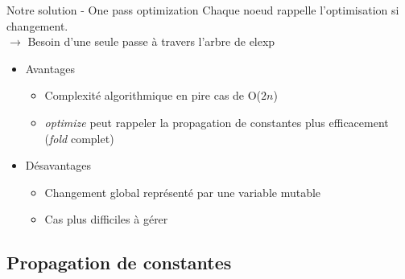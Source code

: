 \documentclass{beamer}
\begin{document}
\begin{frame}{Notre solution - One pass optimization}
  Chaque noeud rappelle l'optimisation si changement. \\
  $\rightarrow$ Besoin d'une seule passe à travers l'arbre de elexp
  \pause
  \begin{itemize}

    \item Avantages
      \begin{itemize}
        \item Complexité algorithmique en pire cas de O($2n$)
        \item \emph{optimize} peut rappeler la propagation de constantes plus
          efficacement (\emph{fold} complet)
      \end{itemize}
  \pause
    \item Désavantages
      \begin{itemize}
        \item Changement global représenté par une variable mutable
        \item Cas plus difficiles à gérer
      \end{itemize}

  \end{itemize}
\end{frame}

\subsection{Propagation de constantes} 
\end{document}
